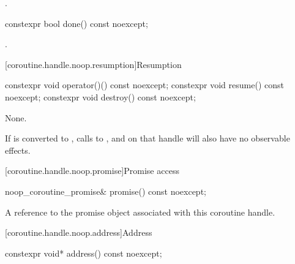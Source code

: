 \begin{itemdescr}
\pnum
\returns
{}.
\end{itemdescr}

%
\begin{itemdecl}
constexpr bool done() const noexcept;
\end{itemdecl}

\begin{itemdescr}
\pnum
\returns
{}.
\end{itemdescr}

[coroutine.handle.noop.resumption]{Resumption}

%
%
%
\begin{itemdecl}
constexpr void operator()() const noexcept;
constexpr void resume() const noexcept;
constexpr void destroy() const noexcept;
\end{itemdecl}

\begin{itemdescr}
\pnum
\effects
None.

\pnum
\remarks
If  is converted to ,
calls to ,  and  on that handle
will also have no observable effects.
\end{itemdescr}

[coroutine.handle.noop.promise]{Promise access}

%
\begin{itemdecl}
noop_coroutine_promise& promise() const noexcept;
\end{itemdecl}

\begin{itemdescr}
\pnum
\returns
A reference to the promise object associated with this
coroutine handle.
\end{itemdescr}

[coroutine.handle.noop.address]{Address}

%
\begin{itemdecl}
constexpr void* address() const noexcept;
\end{itemdecl}

